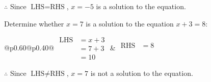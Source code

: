 \documentclass[12pt]{article}
\newcounter{minipagecount}
\begin{document}
\begin{multicols}{2}
\begin{minipage}[t]{0.40\textwidth}
    \noindent \(\therefore\) Since \(\text{LHS} = \text{RHS}\), \(x = -5\) is  a solution to the equation.

\end{minipage}

 \vspace*{16pt}
\noindent{(\theminipagecount)}\hspace{0.1mm} %
\begin{minipage}[t]{0.40\textwidth} %

    \noindent Determine whether \(x = 7\) is a solution to the equation \(x + 3 = 8\):
    \vspace{4pt}  %

    \noindent
    \renewcommand{\arraystretch}{1.3} %
    \begin{tabular}{@{}p{0.60\linewidth}@{}p{0.40\linewidth}@{}}
        \(\begin{aligned}
            \text{LHS} &= x + 3 \\
                    &= 7 + 3 \\
                    &= 10 
        \end{aligned}\) &
        \(\begin{aligned}
            \text{RHS} &= 8\\
                    & \\
                    &
        \end{aligned}\)
    \end{tabular}
    \renewcommand{\arraystretch}{1.0} %
    \vspace{2pt}  %

    \noindent \(\therefore\) Since \(\text{LHS} \neq \text{RHS}\), \(x = 7\) is not  a solution to the equation.

\end{minipage}

 \vspace*{16pt}
\noindent{(\theminipagecount)}\hspace{0.1mm} %
\begin{minipage}[t]{0.40\textwidth} %


\end{minipage}
\end{multicols}
\end{document}
